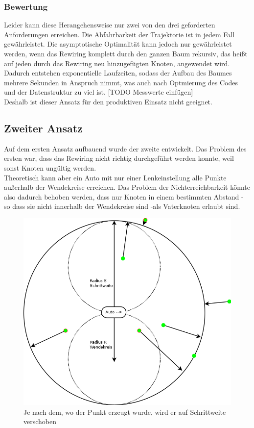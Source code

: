 \subsubsection{Bewertung}
Leider kann diese Herangehensweise nur zwei von den drei geforderten Anforderungen erreichen. Die Abfahrbarkeit der Trajektorie ist in jedem Fall gewährleistet. Die asymptotische Optimalität kann jedoch nur gewährleistet werden, wenn das Rewiring komplett durch den ganzen Baum rekursiv, das heißt auf jeden durch das Rewiring neu hinzugefügten Knoten, angewendet wird. Dadurch entstehen exponentielle Laufzeiten, sodass der Aufbau des Baumes mehrere Sekunden in Anspruch nimmt, was auch nach Optmierung des Codes und der Datenstruktur zu viel ist. [TODO Messwerte einfügen]\\
Deshalb ist dieser Ansatz für den produktiven Einsatz nicht geeignet.

\subsection{Zweiter Ansatz}
Auf dem ersten Ansatz aufbauend wurde der zweite entwickelt. Das Problem des ersten war, dass das Rewiring nicht richtig durchgeführt werden konnte, weil sonst Knoten ungültig werden. \\
Theoretisch kann aber ein Auto mit nur einer Lenkeinstellung alle Punkte außerhalb der Wendekreise erreichen. Das Problem der Nichterreichbarkeit könnte also dadurch behoben werden, dass nur Knoten in einem bestimmten Abstand - so dass sie nicht innerhalb der Wendekreise sind -als Vaterknoten erlaubt sind.\\
\begin{figure}
\centering
\label{fig:zweiteransatz}
\includegraphics[scale=0.5]{Bilder/Zweiter_Ansatz_Projektion.png} 
\caption{Je nach dem, wo der Punkt erzeugt wurde, wird er auf Schrittweite verschoben}
\end{figure}

